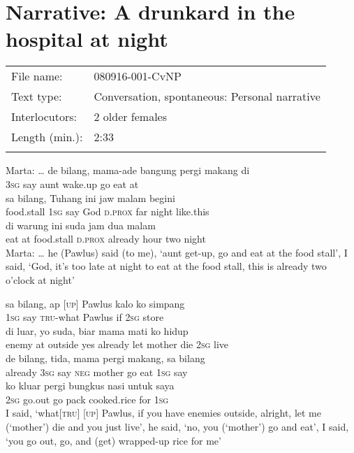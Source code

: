 \section{Narrative: A drunkard in the hospital at night}
\label{Para_B.4}
\begin{tabular}{ll}
\lsptoprule
File name: &  080916-001-CvNP\\
Text type: &  Conversation, spontaneous: Personal narrative\\
Interlocutors: &  2 older females\\
Length (min.): &  2:33\\
\lspbottomrule
\end{tabular}
\setcounter{equation}{0}
\ea
\gll   Marta:    {\ldots}    {de}    {bilang,}    {mama-ade}    {bangung}    {pergi}    {makang}   di\\
{}   {}    {\textsc{3sg}}    {say}    {aunt}    {wake.up}    {go}    {eat}   at\\
    {sa}    {bilang,}    {Tuhang}    {ini}    {jaw}    {malam}    {begini}\\
   {food.stall}    {\textsc{1sg}}    {say}    {God}    {\textsc{d.prox}}    {far}    {night}    {like.this}\\
    {di}    {warung}    {ini}    {suda}    {jam}    {dua}    {malam}\\
   {eat}    {at}    {food.stall}    {\textsc{d.prox}}    {already}    {hour}    {two}    {night}\\
\glt
Marta: {\ldots} he (Pawlus) said (to me), ‘aunt get-up, go and eat at the food stall’, I said, ‘God, it’s too late at night to eat at the food stall, this is already two o’clock at night’
\z

\ea
\gll   sa    {bilang,}    {ap}    {\upshape\textsc{[up]}}    {Pawlus}    {kalo}    {ko}    {simpang}\\
  \textsc{1sg}    {say}    {\textsc{tru}{}-what}    {}    {Pawlus}    {if}    {\textsc{2sg}}    {store}\\
     {di}    {luar,}    {yo}    {suda,}    {biar}    {mama}    {mati}    {ko}    {hidup}\\
   {enemy}    {at}    {outside}    {yes}    {already}    {let}    {mother}    {die}    {\textsc{2sg}}    {live}\\
    {de}    {bilang,}    {tida,}    {mama}    {pergi}    {makang,}    {sa}   bilang\\
   {already}    {\textsc{3sg}}    {say}    {\textsc{neg}}    {mother}    {go}    {eat}    {\textsc{1sg}}   say\\
\gll   ko    {kluar}    {pergi}    {bungkus}    {nasi}    {untuk}    {saya}\\
  \textsc{2sg}    {go.out}    {go}    {pack}    {cooked.rice}    {for}    {\textsc{1sg}}\\
\glt
I said, ‘what[\textsc{tru}] [\textsc{up}] Pawlus, if you have enemies outside, alright, let me (‘mother’) die and you just live’, he said, ‘no, you (‘mother’) go and eat’, I said, ‘you go out, go, and (get) wrapped-up rice for me’
\z


